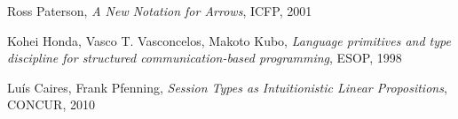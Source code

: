 \documentclass{article}
\begin{document}
\begin{thebibliography}{99}
    Ross Paterson,
    \emph{A New Notation for Arrows},
    ICFP,
    2001

    Kohei Honda, Vasco T. Vasconcelos, Makoto Kubo,
    \emph{Language primitives and type discipline for structured
      communication-based programming},
    ESOP,
    1998

    Lu\'is Caires, Frank Pfenning,
    \emph{Session Types as Intuitionistic Linear Propositions},
    CONCUR,
    2010

\end{thebibliography}

\end{document}
